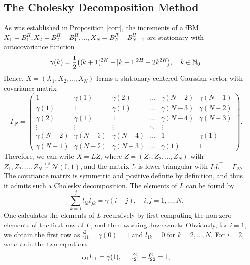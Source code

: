 \subsection{The Cholesky Decomposition Method}
As was established in Proposition \ref{corr}, the increments of a fBM $X_{1}=B_{1}^{H},X_{2}=B_{2}^{H}-B_{1}^{H}, \dots, X_{N}=B_{N}^{H}-B_{N-1}^{H}$ are stationary with autocovariance function
\begin{equation}
    \gamma(k)=\frac{1}{2}\left((k+1)^{2H}+|k-1|^{2H}-2k^{2H}\right), \quad k\in\N_{0}.
\end{equation}
Hence, $X=(X_{1}, X_{2},\dots,X_{N})$ forms a stationary centered Gaussian vector with covariance matrix
\begin{equation}
    \Gamma_{N}=\begin{pmatrix}
        1 & \gamma(1) & \gamma(2) & \dots & \gamma(N-2) & \gamma(N-1)\\
        \gamma(1) & 1 & \gamma(1) & \dots & \gamma(N-3) &  \gamma(N-2)\\
        \gamma(2) & \gamma(1) & 1 & \dots & \gamma(N-4) & \gamma(N-3)\\
        \vdots & \vdots & \vdots & \ddots & \vdots & \vdots\\
        \gamma(N-2) & \gamma(N-3) & \gamma(N-4) & \dots & 1 & \gamma(1)\\
        \gamma(N-1) & \gamma(N-2) & \gamma(N-3) & \dots & \gamma(1) & 1
    \end{pmatrix}.
\end{equation}
Therefore, we can write $X=LZ$, where $Z=(Z_{1},Z_{2},\dots, Z_{N})$ with $Z_{1},Z_{2},\dots, Z_{N}\overset{\textrm{i.i.d.}}{\sim} \mathcal{N}(0,1)$, and the matrix $L$ is lower triangular with $LL^{\top}=\Gamma_{N}$. The covariance matrix is symmetric and positive definite by definition, and thus it admits such a Cholesky decomposition. The elements of $L$ can be found by 
\begin{equation}
    \sum_{k=1}^{j}l_{ik}l_{jk}=\gamma(i-j), \quad i,j=1,\dots, N.
\end{equation}
One calculates the elements of $L$ recursively by first computing the non-zero elements of the first row of $L$, and then working downwards. Obviously, for $i=1$, we obtain the first row as $l_{11}^{2}=\gamma(0)=1$ and $l_{1k}=0$ for $k=2,\dots,N$. For $i=2$, we obtain the two equations
\begin{align*}
    l_{21}l_{11}=\gamma(1), \hspace{15 pt} l_{21}^{2}+l_{22}^{2}=1,
\end{align*}
